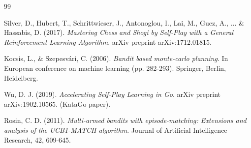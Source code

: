 \documentclass[12pt,a4paper,oneside]{report}
\begin{document}
\begin{thebibliography}{99}

Silver, D., Hubert, T., Schrittwieser, J., Antonoglou, I., Lai, M., Guez, A., ... \& Hassabis, D. (2017).
\textit{Mastering Chess and Shogi by Self-Play with a General Reinforcement Learning Algorithm}.
arXiv preprint arXiv:1712.01815.

Kocsis, L., \& Szepesvári, C. (2006).
\textit{Bandit based monte-carlo planning}.
In European conference on machine learning (pp. 282-293). Springer, Berlin, Heidelberg.

Wu, D. J. (2019).
\textit{Accelerating Self-Play Learning in Go}.
arXiv preprint arXiv:1902.10565. (KataGo paper).

Rosin, C. D. (2011).
\textit{Multi-armed bandits with episode-matching: Extensions and analysis of the UCB1-MATCH algorithm}.
Journal of Artificial Intelligence Research, 42, 609-645.

\end{thebibliography}
\end{document}
